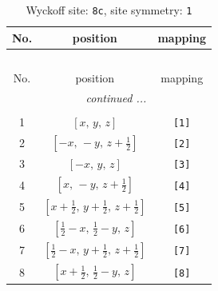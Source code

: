 \documentclass[fleqn,8pt]{jsarticle}
\begin{document}
\renewcommand{\arraystretch}{1.2}
\begin{longtable}{ccc}
\caption{Wyckoff site: {\tt 8c}, site symmetry: {\tt 1}}
 \\
 \hline \hline
No. & position & mapping \\ \hline \endfirsthead

\multicolumn{2}{l}{\tablename\ \thetable{}} \\
 \hline \hline
No. & position & mapping \\ \hline \endhead

 \hline \hline
\multicolumn{2}{r}{\footnotesize\it continued ...} \\ \endfoot

 \hline \hline
\multicolumn{2}{r}{} \\ \endlastfoot

1 & $\left[ x,\, y,\, z \right]$ & {\tt [1]} \\ \hline
2 & $\left[ - x,\, - y,\, z + \frac{1}{2} \right]$ & {\tt [2]} \\ \hline
3 & $\left[ - x,\, y,\, z \right]$ & {\tt [3]} \\ \hline
4 & $\left[ x,\, - y,\, z + \frac{1}{2} \right]$ & {\tt [4]} \\ \hline
5 & $\left[ x + \frac{1}{2},\, y + \frac{1}{2},\, z + \frac{1}{2} \right]$ & {\tt [5]} \\ \hline
6 & $\left[ \frac{1}{2} - x,\, \frac{1}{2} - y,\, z \right]$ & {\tt [6]} \\ \hline
7 & $\left[ \frac{1}{2} - x,\, y + \frac{1}{2},\, z + \frac{1}{2} \right]$ & {\tt [7]} \\ \hline
8 & $\left[ x + \frac{1}{2},\, \frac{1}{2} - y,\, z \right]$ & {\tt [8]} \\
\end{longtable}
\end{document}
